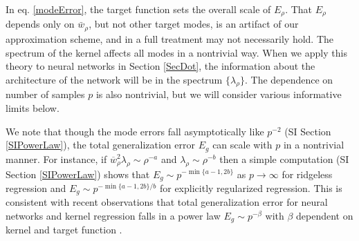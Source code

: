 \documentclass{article}
\begin{document}
In eq. \eqref{modeError}, the target function sets the overall scale of $E_{\rho}$. That $E_{\rho}$ depends only on $\bar w_{\rho}$, but not other target modes, is an artifact of our approximation scheme, and in a full treatment may not necessarily hold. The spectrum of the kernel affects all modes in a nontrivial way. When we apply this theory to neural networks in Section \ref{SecDot}, the information about the architecture of the network will be in the spectrum $\{\lambda_{\rho}\}$. The dependence on number of samples $p$ is also nontrivial, but we will consider various informative limits below. 

We note that though the mode errors fall asymptotically like $p^{-2}$ (SI Section \ref{SIPowerLaw}), the total generalization error $E_g$ can scale with $p$ in a nontrivial manner. For instance, if $\overline{w}^2_{\rho} \lambda_{\rho} \sim {\rho}^{-a}$ and $\lambda_{\rho} \sim {\rho}^{-b}$ then a simple computation (SI Section \ref{SIPowerLaw}) shows that $E_g \sim p^{- \min\{a-1,2b\}}$ as $p\to\infty$ for ridgeless regression and $E_g \sim p^{- \min\{ a-1,2b\}/b}$ for explicitly regularized regression. This is consistent with recent observations that total generalization error for neural networks and kernel regression falls in a power law $E_g \sim p^{-\beta}$ with $\beta$ dependent on kernel and target function \cite{hestness2017deep,spigler2019asymptotic}.




\end{document}
